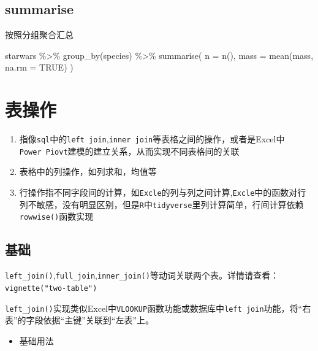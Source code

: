 \documentclass[
]{book}
\newenvironment{Shaded}{\begin{snugshade}}{\end{snugshade}}
\newcommand{\AttributeTok}[1]{\textcolor[rgb]{0.77,0.63,0.00}{#1}}
\newcommand{\ConstantTok}[1]{\textcolor[rgb]{0.00,0.00,0.00}{#1}}
\newcommand{\FunctionTok}[1]{\textcolor[rgb]{0.00,0.00,0.00}{#1}}
\newcommand{\NormalTok}[1]{#1}
\newcommand{\SpecialCharTok}[1]{\textcolor[rgb]{0.00,0.00,0.00}{#1}}
\providecommand{\tightlist}{%
  \setlength{\itemsep}{0pt}\setlength{\parskip}{0pt}}
\begin{document}
\hypertarget{summarise}{%
\subsection{summarise}\label{summarise}}

按照分组聚合汇总

\begin{Shaded}
\begin{Highlighting}[]
\NormalTok{starwars }\SpecialCharTok{\%\textgreater{}\%}
  \FunctionTok{group\_by}\NormalTok{(species) }\SpecialCharTok{\%\textgreater{}\%}
  \FunctionTok{summarise}\NormalTok{(}
    \AttributeTok{n =} \FunctionTok{n}\NormalTok{(),}
    \AttributeTok{mass =} \FunctionTok{mean}\NormalTok{(mass, }\AttributeTok{na.rm =} \ConstantTok{TRUE}\NormalTok{)}
\NormalTok{  )}
\end{Highlighting}
\end{Shaded}

\hypertarget{ux8868ux64cdux4f5c}{%
\section{表操作}\label{ux8868ux64cdux4f5c}}

\begin{enumerate}
\def\labelenumi{\arabic{enumi}.}
\item
  指像\texttt{sql}中的\texttt{left\ join},\texttt{inner\ join}等表格之间的操作，或者是Excel中\texttt{Power\ Piovt}建模的建立关系，从而实现不同表格间的关联
\item
  表格中的列操作，如列求和，均值等
\item
  行操作指不同字段间的计算，如\texttt{Excle}的列与列之间计算,\texttt{Excle}中的函数对行列不敏感，没有明显区别，但是\texttt{R}中\texttt{tidyverse}里列计算简单，行间计算依赖\texttt{rowwise()}函数实现
\end{enumerate}

\hypertarget{ux57faux7840-4}{%
\subsection{基础}\label{ux57faux7840-4}}

\texttt{left\_join()},\texttt{full\_join},\texttt{inner\_join()}等动词关联两个表。详情请查看：\texttt{vignette("two-table")}

\texttt{left\_join()}实现类似Excel中\texttt{VLOOKUP}函数功能或数据库中\texttt{left\ join}功能，将``右表''的字段依据``主键''关联到``左表''上。

\begin{itemize}
\tightlist
\item
  基础用法
\end{itemize}
\end{document}
